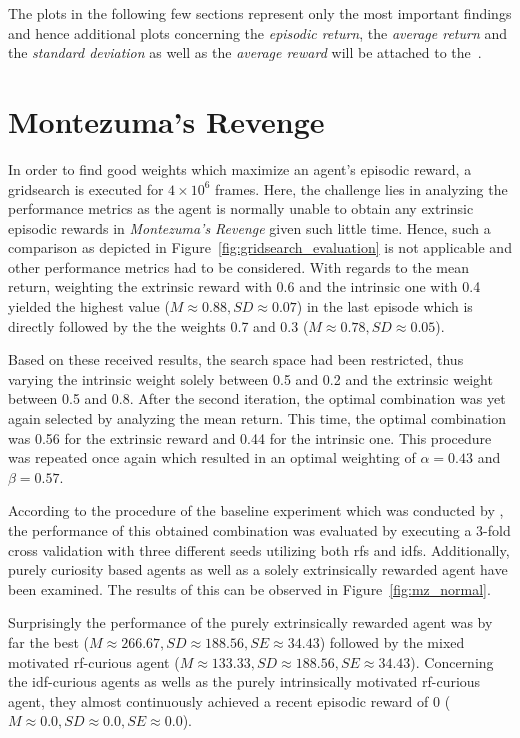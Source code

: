 \documentclass[draft,final]{vutinfth} %
\begin{document}
    The plots in the following few sections represent only the most important findings and hence additional plots concerning the \textit{episodic return}, the \textit{average return} and the \textit{standard deviation} as well as the \textit{average reward} will be attached to the~.


    \section{Montezuma's Revenge}

    In order to find good weights which maximize an agent's episodic reward, a gridsearch is executed for $4 \times 10^6$ frames.
    Here, the challenge lies in analyzing the performance metrics as the agent is normally unable to obtain any extrinsic episodic rewards in \textit{Montezuma's Revenge} given such little time.
    Hence, such a comparison as depicted in Figure~\ref{fig:gridsearch_evaluation} is not applicable and other performance metrics had to be considered.
    With regards to the mean return, weighting the extrinsic reward with 0.6 and the intrinsic one with 0.4 yielded the highest value ($M\approx0.88,SD\approx0.07$) in the last episode which is directly followed by the the weights 0.7 and 0.3 ($M\approx0.78,SD\approx0.05$).

    Based on these received results, the search space had been restricted, thus varying the intrinsic weight solely between 0.5 and 0.2 and the extrinsic weight between 0.5 and 0.8.
    After the second iteration, the optimal combination was yet again selected by analyzing the mean return.
    This time, the optimal combination was 0.56 for the extrinsic reward and 0.44 for the intrinsic one.
    This procedure was repeated once again which resulted in an optimal weighting of $\alpha=0.43$ and $\beta=0.57$.

    According to the procedure of the baseline experiment which was conducted by \citet{burda_large-scale_2018-1}, the performance of this obtained combination was evaluated by executing a 3-fold cross validation with three different seeds utilizing both \glspl{rf} and \glspl{idf}.
    Additionally, purely curiosity based agents as well as a solely extrinsically rewarded agent have been examined.
    The results of this can be observed in Figure~\ref{fig:mz_normal}.

    Surprisingly the performance of the purely extrinsically rewarded agent was by far the best ($M\approx266.67,SD\approx188.56,SE\approx34.43$) followed by the mixed motivated \gls{rf}-curious agent ($M\approx133.33,SD\approx188.56,SE\approx34.43$).
    Concerning the \gls{idf}-curious agents as wells as the purely intrinsically motivated \gls{rf}-curious agent, they almost continuously achieved a recent episodic reward of 0 ($M\approx0.0,SD\approx0.0,SE\approx0.0$).
\end{document}
